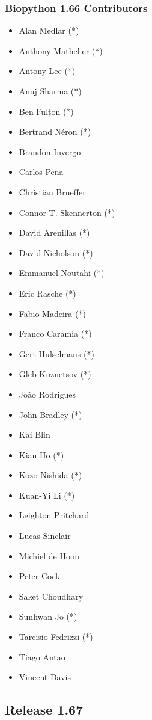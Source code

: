 \documentclass[trans]{beamer}
\begin{document}
\frame
{
  \frametitle{Biopython 1.66 Contributors}

  \scriptsize{
  \begin{multicols}{2}
  \begin{itemize}
  \item Alan Medlar (*)
  \item Anthony Mathelier (*)
  \item Antony Lee (*)
  \item Anuj Sharma (*)
  \item Ben Fulton (*)
  \item Bertrand Néron (*)
  \item Brandon Invergo
  \item Carlos Pena
  \item Christian Brueffer
  \item Connor T. Skennerton (*)
  \item David Arenillas (*)
  \item David Nicholson (*)
  \item Emmanuel Noutahi (*)
  \item Eric Rasche (*)
  \item Fabio Madeira (*)
  \item Franco Caramia (*)
  \item Gert Hulselmans (*)
  \item Gleb Kuznetsov (*)
  \item João Rodrigues
  \item John Bradley (*)
  \item Kai Blin
  \item Kian Ho (*)
  \item Kozo Nishida (*)
  \item Kuan-Yi Li (*)
  \item Leighton Pritchard
  \item Lucas Sinclair
  \item Michiel de Hoon
  \item Peter Cock
  \item Saket Choudhary
  \item Sunhwan Jo (*)
  \item Tarcisio Fedrizzi (*)
  \item Tiago Antao
  \item Vincent Davis
  \end{itemize}
  \end{multicols}
  }
}

\subsection*{Release 1.67}
\frame
{
}
\end{document}
